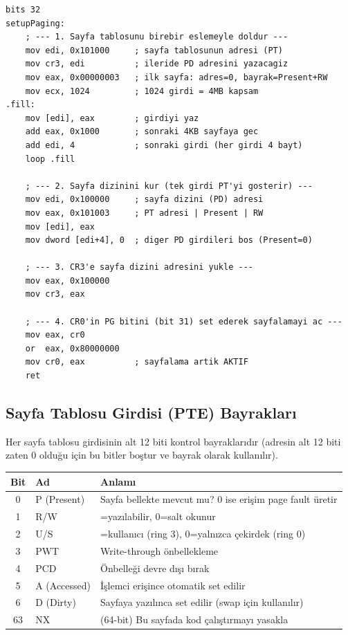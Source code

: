 \documentclass[11pt,a4paper]{article}
\begin{document}
\begin{ornekkutu}
\begin{lstlisting}
bits 32
setupPaging:
    ; --- 1. Sayfa tablosunu birebir eslemeyle doldur ---
    mov edi, 0x101000     ; sayfa tablosunun adresi (PT)
    mov cr3, edi          ; ileride PD adresini yazacagiz
    mov eax, 0x00000003   ; ilk sayfa: adres=0, bayrak=Present+RW
    mov ecx, 1024         ; 1024 girdi = 4MB kapsam
.fill:
    mov [edi], eax        ; girdiyi yaz
    add eax, 0x1000       ; sonraki 4KB sayfaya gec
    add edi, 4            ; sonraki girdi (her girdi 4 bayt)
    loop .fill

    ; --- 2. Sayfa dizinini kur (tek girdi PT'yi gosterir) ---
    mov edi, 0x100000     ; sayfa dizini (PD) adresi
    mov eax, 0x101003     ; PT adresi | Present | RW
    mov [edi], eax
    mov dword [edi+4], 0  ; diger PD girdileri bos (Present=0)

    ; --- 3. CR3'e sayfa dizini adresini yukle ---
    mov eax, 0x100000
    mov cr3, eax

    ; --- 4. CR0'in PG bitini (bit 31) set ederek sayfalamayi ac ---
    mov eax, cr0
    or  eax, 0x80000000
    mov cr0, eax          ; sayfalama artik AKTIF
    ret
\end{lstlisting}
\end{ornekkutu}

\subsection{Sayfa Tablosu Girdisi (PTE) Bayrakları}

Her sayfa tablosu girdisinin alt 12 biti kontrol bayraklarıdır (adresin alt 12
biti zaten 0 olduğu için bu bitler boştur ve bayrak olarak kullanılır).

\begin{center}
\begin{tabularx}{\textwidth}{@{}c l >{\raggedright\arraybackslash}X@{}}
\toprule
\rowcolor{anaMavi}\color{white}\textbf{Bit} & \color{white}\textbf{Ad} & \color{white}\textbf{Anlamı} \\
\midrule
0 & P (Present) & Sayfa bellekte mevcut mu? 0 ise erişim page fault üretir \\
\rowcolor{acikGri} 1 & R/W & 1=yazılabilir, 0=salt okunur \\
2 & U/S & 1=kullanıcı (ring 3), 0=yalnızca çekirdek (ring 0) \\
\rowcolor{acikGri} 3 & PWT & Write-through önbellekleme \\
4 & PCD & Önbelleği devre dışı bırak \\
\rowcolor{acikGri} 5 & A (Accessed) & İşlemci erişince otomatik set edilir \\
6 & D (Dirty) & Sayfaya yazılınca set edilir (swap için kullanılır) \\
\rowcolor{acikGri} 63 & NX & (64-bit) Bu sayfada kod çalıştırmayı yasakla \\
\bottomrule
\end{tabularx}
\end{center}
\end{document}
